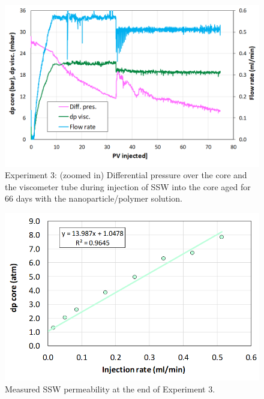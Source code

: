 \begin{figure}[h!]
    \centering
    \includegraphics[width=\textwidth]{img/cht/gelexp3_3.png}
    \caption{Experiment 3: (zoomed in) Differential pressure over the core and the viscometer tube during injection of SSW into the core aged for 66 days with the nanoparticle/polymer solution.}
    \label{cht:gelexp3_3} %
\end{figure}

\begin{figure}[h!]
    \centering
    \includegraphics[width=\textwidth]{img/cht/gelexp3_4.png}
    \caption{Measured SSW permeability at the end of Experiment 3.}
    \label{cht:gelexp3_4} %
\end{figure}

\FloatBarrier
